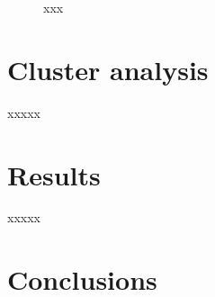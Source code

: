 \documentclass{aa}
\begin{document}
 \begin{figure}
  \caption{xxx}
  \label{fig:MWmap}
 \end{figure}





\section{Cluster analysis}
 \label{sec:clust_analy}

 xxxxx





\section{Results}
 \label{sec:results}

 xxxxx





\section{Conclusions}
 \label{sec:conclusions}
\end{document}
